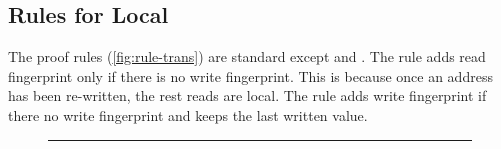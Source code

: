\subsection{Rules for Local}

The proof rules (\cref{fig:rule-trans}) are standard except  and .
The  rule adds read fingerprint only if there is no write fingerprint.
This is because once an address has been re-written, the rest reads are local.
The rule adds write fingerprint if there no write fingerprint and keeps the last written value.


\begin{figure}[!t]
\hrule
{}



\end{figure}
